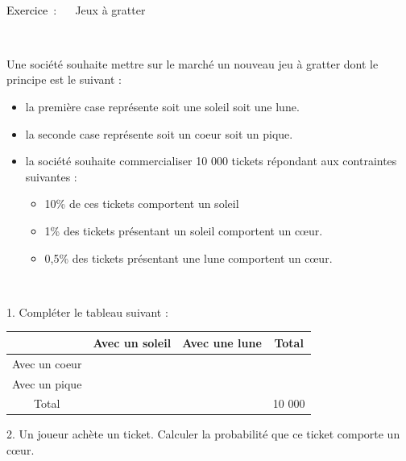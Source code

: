 \documentclass[11pt,a4paper]{article}
\newcounter{numexos}%
\newcommand{\exercice}[1]{%
\addtocounter{numexos}{1}%
\textcolor{black}{\normalsize Exercice\,\thenumexos\,}\,#1%
}
\newcommand{\bex}[2]
{\begin{bclogo}[couleur = white,logo= , barre=none,  arrondi = 0.1]
{~\exercice:~~{#1}}
~~
{#2}
~~
\end{bclogo}}
\newcommand{\cadre}[1]
{\begin{bclogo}[couleur = white,logo=,  arrondi = 0.1,barre=none]
~~
{%
\rule{0mm}{#1mm}}\par
\medskip
~~
\end{bclogo}}
\begin{document}
\bex{ Jeux à gratter} { 
Une société souhaite mettre sur le marché un nouveau jeu à gratter dont le principe est le suivant : 
   \begin{itemize}
   		\item la première case représente soit une soleil soit une lune.  
   		\item la seconde case représente soit un coeur soit un pique.
   		\item la société souhaite commercialiser 10 000 tickets répondant aux contraintes suivantes : 
   			\begin{itemize}
   			\item 10\% de ces tickets comportent un soleil
   			\item 1\% des tickets présentant un soleil comportent un cœur. 
   			\item 0,5\% des tickets présentant une lune comportent un cœur.  
   			\end{itemize}
   \end{itemize}
   }

  
   	  1. Compléter le tableau suivant : \\
      \begin{center}
          
   	  \begin{tabular} { | c | c | c | c | }
   \hline
 \rowcolor{white}     & Avec un soleil & Avec une lune & Total \\
   \hline 
   \rowcolor{white}     Avec un coeur  & ~~ & ~~ & ~~ \\
   \hline
   \rowcolor{white}      Avec un pique  & ~~ & ~~ & ~~  \\
   \hline
   \rowcolor{white}      Total  & ~~ & ~~ & 10 000   \\
   \hline
 \end{tabular}
  \end{center}
  
 2.  Un joueur achète un ticket. Calculer la probabilité que ce ticket comporte un cœur.
 \cadre{5}


 \vfill
\end{document}
